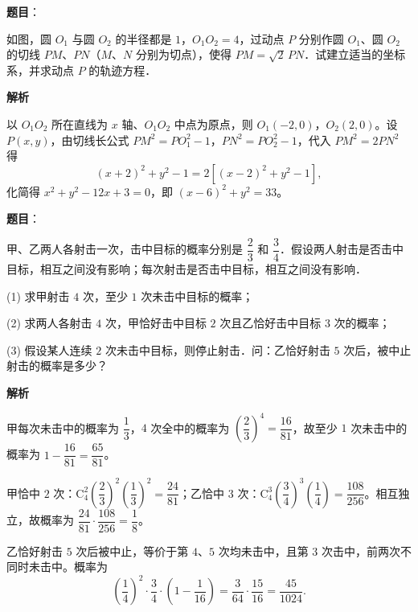 \begin{answer}

\textbf{题目}：

如图，圆 $O_1$ 与圆 $O_2$ 的半径都是 $1$，$O_1O_2 = 4$，过动点 $P$ 分别作圆 $O_1$、圆 $O_2$ 的切线 $PM$、$PN$（$M$、$N$ 分别为切点），使得 $PM = \sqrt{2}\,PN$．试建立适当的坐标系，并求动点 $P$ 的轨迹方程．
\nopagebreak[4]
\begin{center}\end{center}
\nopagebreak[4]
\textbf{解析}

以 $O_1O_2$ 所在直线为 $x$ 轴、$O_1O_2$ 中点为原点，则 $O_1(-2, 0)$，$O_2(2, 0)$。设 $P(x, y)$，由切线长公式 $PM^2 = PO_1^2 - 1$，$PN^2 = PO_2^2 - 1$，代入 $PM^2 = 2PN^2$ 得
\nopagebreak[4]
\[
(x+2)^2 + y^2 - 1 = 2\left[(x-2)^2 + y^2 - 1\right],
\]
化简得 $x^2 + y^2 - 12x + 3 = 0$，即 $(x - 6)^2 + y^2 = 33$。


\end{answer}
\begin{answer}

\textbf{题目}：

甲、乙两人各射击一次，击中目标的概率分别是 $\dfrac{2}{3}$ 和 $\dfrac{3}{4}$．假设两人射击是否击中目标，相互之间没有影响；每次射击是否击中目标，相互之间没有影响．

(1) 求甲射击 $4$ 次，至少 $1$ 次未击中目标的概率；

(2) 求两人各射击 $4$ 次，甲恰好击中目标 $2$ 次且乙恰好击中目标 $3$ 次的概率；

(3) 假设某人连续 $2$ 次未击中目标，则停止射击．问：乙恰好射击 $5$ 次后，被中止射击的概率是多少？

\textbf{解析}


甲每次未击中的概率为 $\dfrac{1}{3}$，$4$ 次全中的概率为 $\left(\dfrac{2}{3}\right)^4 = \dfrac{16}{81}$，故至少 $1$ 次未击中的概率为 $1 - \dfrac{16}{81} = \dfrac{65}{81}$。


甲恰中 $2$ 次：$\mathrm{C}_4^2\left(\dfrac{2}{3}\right)^2\left(\dfrac{1}{3}\right)^2 = \dfrac{24}{81}$；乙恰中 $3$ 次：$\mathrm{C}_4^3\left(\dfrac{3}{4}\right)^3\left(\dfrac{1}{4}\right) = \dfrac{108}{256}$。相互独立，故概率为 $\dfrac{24}{81}\cdot\dfrac{108}{256} = \dfrac{1}{8}$。


乙恰好射击 $5$ 次后被中止，等价于第 $4$、$5$ 次均未击中，且第 $3$ 次击中，前两次不同时未击中。概率为
\nopagebreak[4]
\[
\left(\frac{1}{4}\right)^2\cdot\frac{3}{4}\cdot\left(1 - \frac{1}{16}\right) = \frac{3}{64}\cdot\frac{15}{16} = \frac{45}{1024}.
\]




\end{answer}
